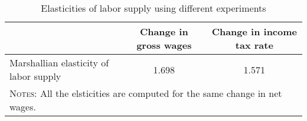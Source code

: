 \begin{table}[htbp]\caption{Elasticities of labor supply using different experiments}\label{table:elasticities}\centering\footnotesize\begin{tabular}{lcc} \toprule & Change in gross wages & Change in income tax rate   \\\midrule    Marshallian elasticity of labor supply &1.698&1.571\\  \bottomrule\multicolumn{3}{l}{\textsc{Notes:} All the elsticities are computed for the same change in net wages.}\end{tabular}
      \end{table}